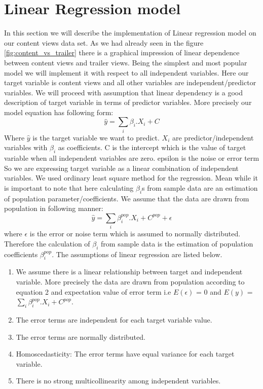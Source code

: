 \documentclass[12pt,a4paper]{style}
\begin{document}
\section{Linear Regression model}
In this section we will describe the implementation of Linear regression model on our content views data set. As we had already seen in the figure \ref{fig:content_vs_trailer} there is a graphical impression of linear dependence between content views and trailer views. Being the simplest and most popular model we will implement it with respect to all independent variables. Here our target variable is content views and all other variables are independent/predictor variables. We will proceed with assumption that linear dependency is a good description of target variable in terms of predictor variables. More precisely our model equation has following form:
\begin{equation}
	\hat{y}=\sum_i \beta_i.X_i + C 
\end{equation}
Where $\hat{y}$ is the target variable we want to predict. $X_i$ are predictor/independent variables with $\beta_i$ as coefficients. C is the intercept which is the value of target variable when all independent variables are zero. epsilon is the noise or error term  So we are expressing target variable as a linear combination of independent variables. We used ordinary least square method for the regression. Mean while it is important to note that here calculating $\beta_i$s from sample data are an estimation of population parameter/coefficients. We assume that the data are drawn from population in following manner:
\begin{equation}
	\hat{y}=\sum_i \beta^{pop}_i.X_i + C^{pop} + \epsilon 
\end{equation}
where $\epsilon$ is the error or noise term which is assumed to normally distributed. Therefore the calculation of $\beta_i$ from sample data is the estimation of population coefficients $\beta^{pop}_i$. The assumptions of linear regression are listed below.
\begin{enumerate}
	\item We assume there is a linear relationship between target and independent variable. More precisely the data are drawn from population according to equation 2 and expectation value of error term i.e $E(\epsilon)$ = 0 and $E(y)$ = $\sum_i \beta^{pop}_i.X_i + C^{pop}$.
	\item The error terms are independent for each target variable value.
	\item The error terms are normally distributed.
	\item Homoscedasticity: The error terms have equal variance for each target variable.
	\item There is no strong multicollinearity among independent variables.
\end{enumerate}
\end{document}
